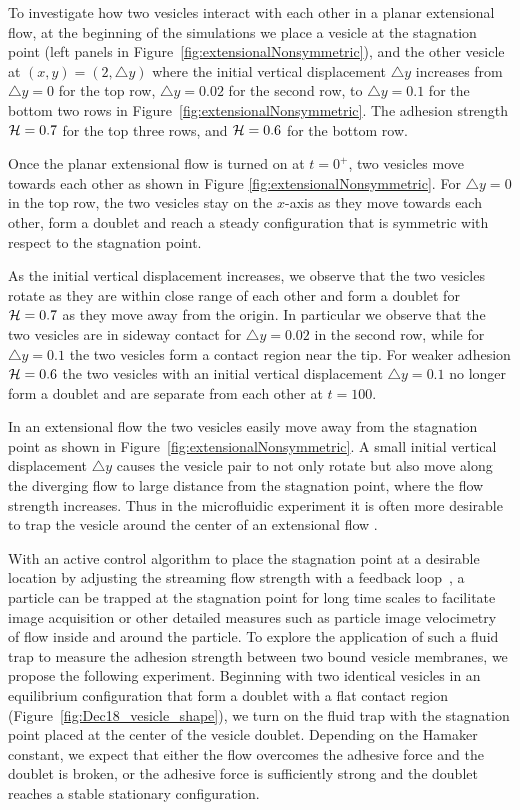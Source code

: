 \documentclass[prf,superscriptaddress,showkeys]{revtex4-1}
\begin{document}
To investigate how two vesicles interact with each other in a planar extensional flow,
at the beginning of the simulations
we place a vesicle at the stagnation point (left panels in Figure~\ref{fig:extensionalNonsymmetric}), 
and the other vesicle at $(x,y) = (2,\triangle y)$ where the initial vertical displacement $\triangle y$ increases from
$\triangle y=0$ for the top row, $\triangle y = 0.02$ for the second row, to
$\triangle y =0.1$ for the bottom two rows in Figure~\ref{fig:extensionalNonsymmetric}.
The adhesion strength ${\cal H} = 0.7$ for the top three rows, and ${\cal H} =0.6$ for the bottom row.

Once the planar extensional flow is turned on at $t=0^+$, two vesicles move
towards each other  as shown in  Figure \ref{fig:extensionalNonsymmetric}.
For $\triangle y=0$ in the top row, the two vesicles stay on the $x$-axis as they move towards each other, 
form a doublet and reach a steady 
configuration that is symmetric with respect to the stagnation point. 

As the initial vertical displacement increases, we observe that 
the two vesicles rotate as they are within close range of each other 
and form a doublet for ${\cal H}=0.7$ as they move away from the origin.
In particular we observe that the two vesicles are in sideway contact for $\triangle y = 0.02$ in the second row,
 while for $\triangle y = 0.1$ the two vesicles form a contact region near the tip.
%
For weaker adhesion ${\cal H}=0.6$ the two vesicles with an initial vertical displacement $\triangle y = 0.1$ no longer form a doublet
and are separate from each other at $t=100$.

In an extensional flow the two vesicles easily move away from the stagnation point as shown in Figure~\ref{fig:extensionalNonsymmetric}.
A small initial vertical displacement $\triangle y$ causes the vesicle pair to not only rotate but also move along the diverging flow to large
distance from the stagnation point, where the flow strength increases. Thus in the microfluidic experiment it is often more desirable to trap the vesicle around the center of an extensional flow \cite{Spjut2010_MSThesis_Chapter3}.


With an active
control algorithm to place the stagnation point at a desirable location
by adjusting the streaming flow strength with a feedback
loop~\cite{Johnson-Chavarria2011_EMJ}, a particle can be trapped at the
stagnation point for long time scales to facilitate image acquisition or
other detailed measures such as particle image velocimetry of flow
inside and around the particle.  To explore the application of such a
fluid trap to measure the adhesion strength between two bound vesicle
membranes, we propose the following experiment.  Beginning with two
identical vesicles in an equilibrium configuration that form a doublet
with a flat contact region (Figure~\ref{fig:Dec18_vesicle_shape}), we
turn on the fluid trap with the stagnation point placed at the center of
the vesicle doublet.  Depending on the Hamaker constant, we expect that
either the flow overcomes the adhesive force and the doublet is broken,
or the adhesive force is sufficiently strong and the doublet reaches a
stable stationary configuration.
\end{document}
